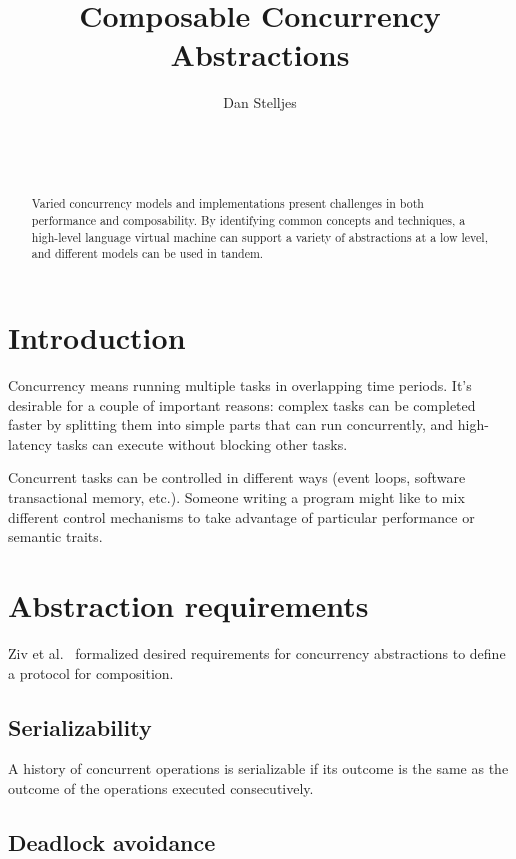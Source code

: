 \documentclass{sig-alternate}
\author{
\alignauthor{}
Dan Stelljes\\
  \affaddr{Division of Science and Mathematics}\\
  \affaddr{University of Minnesota, Morris}\\
  \affaddr{Morris, Minnesota, USA 56267}\\
  \email{stell124@morris.umn.edu}
}
\title{Composable Concurrency Abstractions}
\begin{document}
\maketitle

\begin{abstract}
Varied concurrency models and implementations present challenges in both performance and composability. By identifying common concepts and techniques, a high-level language virtual machine can support a variety of abstractions at a low level, and different models can be used in tandem.
\end{abstract}


\section{Introduction}

Concurrency means running multiple tasks in overlapping time periods. It's desirable for a couple of important reasons: complex tasks can be completed faster by splitting them into simple parts that can run concurrently, and high-latency tasks can execute without blocking other tasks.

Concurrent tasks can be controlled in different ways (event loops, software transactional memory, etc.). Someone writing a program might like to mix different control mechanisms to take advantage of particular performance or semantic traits.

\section{Abstraction requirements}

Ziv et al.~\cite{Ziv2015} formalized desired requirements for concurrency abstractions to define a protocol for composition.

\subsection{Serializability}

A history of concurrent operations is serializable if its outcome is the same as the outcome of the operations executed consecutively.

\subsection{Deadlock avoidance}
\end{document}
